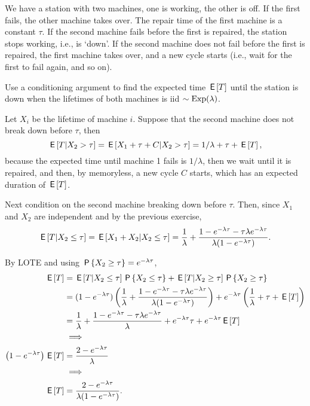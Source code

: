 \begin{exercise}
We have a station with two machines, one is working, the other is off.
If the first fails, the other machine takes over.
The repair time of the first machine is a constant $\tau$.
If the second machine fails before the first is repaired, the station stops working, i.e., is `down'. If the second machine does not fail before the first is repaired, the first machine takes over, and a new cycle starts (i.e., wait for the first to fail again, and so on).

Use a conditioning argument to find the expected time $\E T$ until the station is down when the lifetimes of both machines is iid $\sim\Exp{\lambda}$.
\begin{solution}
Let $X_i$ be the lifetime of machine $i$. Suppose that  the second machine does not break down before $\tau$, then
\begin{equation}
\E{T| X_{2}>\tau} = \E{X_{1} + \tau + C |X_2>\tau} = 1/\lambda + \tau + \E T,
\end{equation}
because the expected time until machine 1 fails is $1/\lambda$, then we wait until it is repaired, and then, by memoryless, a new cycle $C$ starts, which has an expected duration of $\E T$.

Next condition on the second machine breaking down before $\tau$. Then, since $X_{1}$ and $X_2$ are independent and by the previous exercise,
\begin{equation}
\E{T| X_{2}\leq \tau} = \E{X_{1} + X_{2}  |X_2\leq \tau} = \frac{1}{\lambda} + \frac{ 1- e^{-\lambda \tau}- \tau \lambda  e^{-\lambda \tau}}{\lambda(1-e^{-\lambda \tau})}.
\end{equation}

By LOTE and using $\P{X_{2}\geq \tau} = e^{-\lambda \tau}$,
\begin{align}
  \label{eq:924}
\E T
&=
\E{T| X_{2}\leq \tau} \P{X_{2}\leq \tau} + \E{T| X_{2}\geq \tau} \P{X_{2}\geq \tau} \\
&=(1-e^{-\lambda \tau})\left( \frac 1\lambda+
\frac{ 1- e^{-\lambda \tau}- \tau \lambda  e^{-\lambda \tau}}{\lambda(1-e^{-\lambda \tau})} \right)
+e^{-\lambda \tau}\left( \frac{1}{\lambda} + \tau + \E T \right) \\
&=\frac{1}{\lambda} + \frac{ 1- e^{-\lambda \tau}- \tau \lambda  e^{-\lambda \tau}}{\lambda}
+e^{-\lambda \tau} \tau + e^{-\lambda \tau}\E T \\
&\implies \\
\left( 1-e^{-\lambda \tau} \right) \E T
&=\frac{2-e^{-\lambda \tau}}{\lambda} \\
&\implies \\
\E T
&=\frac{2-e^{-\lambda \tau}}{\lambda(1-e^{-\lambda \tau})}.
\end{align}


\end{solution}
\end{exercise}
